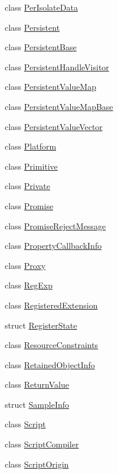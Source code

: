 \begin{DoxyCompactItemize}
class \hyperlink{classv8_1_1_per_isolate_data}{Per\+Isolate\+Data}
\item 
class \hyperlink{classv8_1_1_persistent}{Persistent}
\item 
class \hyperlink{classv8_1_1_persistent_base}{Persistent\+Base}
\item 
class \hyperlink{classv8_1_1_persistent_handle_visitor}{Persistent\+Handle\+Visitor}
\item 
class \hyperlink{classv8_1_1_persistent_value_map}{Persistent\+Value\+Map}
\item 
class \hyperlink{classv8_1_1_persistent_value_map_base}{Persistent\+Value\+Map\+Base}
\item 
class \hyperlink{classv8_1_1_persistent_value_vector}{Persistent\+Value\+Vector}
\item 
class \hyperlink{classv8_1_1_platform}{Platform}
\item 
class \hyperlink{classv8_1_1_primitive}{Primitive}
\item 
class \hyperlink{classv8_1_1_private}{Private}
\item 
class \hyperlink{classv8_1_1_promise}{Promise}
\item 
class \hyperlink{classv8_1_1_promise_reject_message}{Promise\+Reject\+Message}
\item 
class \hyperlink{classv8_1_1_property_callback_info}{Property\+Callback\+Info}
\item 
class \hyperlink{classv8_1_1_proxy}{Proxy}
\item 
class \hyperlink{classv8_1_1_reg_exp}{Reg\+Exp}
\item 
class \hyperlink{classv8_1_1_registered_extension}{Registered\+Extension}
\item 
struct \hyperlink{structv8_1_1_register_state}{Register\+State}
\item 
class \hyperlink{classv8_1_1_resource_constraints}{Resource\+Constraints}
\item 
class \hyperlink{classv8_1_1_retained_object_info}{Retained\+Object\+Info}
\item 
class \hyperlink{classv8_1_1_return_value}{Return\+Value}
\item 
struct \hyperlink{structv8_1_1_sample_info}{Sample\+Info}
\item 
class \hyperlink{classv8_1_1_script}{Script}
\item 
class \hyperlink{classv8_1_1_script_compiler}{Script\+Compiler}
\item 
class \hyperlink{classv8_1_1_script_origin}{Script\+Origin}

\end{DoxyCompactItemize}
